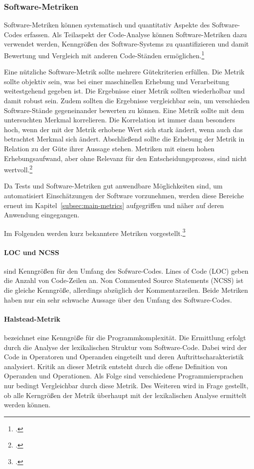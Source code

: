 \subsubsection{Software-Metriken}
\label{subsubsec:base-metrics}
Software-Metriken können systematisch und quantitativ Aspekte des Software-Codes erfassen. Als Teilaspekt der Code-Analyse können Software-Metriken dazu verwendet werden, Kenngrößen des Software-Systems zu quantifizieren und damit Bewertung und Vergleich mit anderen Code-Ständen ermöglichen.\footcite[S.247][]{software-quality2008}

Eine nützliche Software-Metrik sollte mehrere Gütekriterien erfüllen. Die Metrik sollte objektiv sein, was bei einer maschinellen Erhebung und Verarbeitung weitestgehend gegeben ist. Die Ergebnisse einer Metrik sollten wiederholbar und damit robust sein. Zudem sollten die Ergebnisse vergleichbar sein, um verschieden Software-Stände gegeneinander bewerten zu können. Eine Metrik sollte mit dem untersuchten Merkmal korrelieren. Die Korrelation ist immer dann besonders hoch, wenn der mit der Metrik erhobene Wert sich stark ändert, wenn auch das betrachtet Merkmal sich ändert. Abschließend sollte die Erhebung der Metrik in Relation zu der Güte ihrer Aussage stehen. Metriken mit einem hohen Erhebungsaufwand, aber ohne Relevanz für den Entscheidungsprozess, sind nicht wertvoll.\footcite[S.248 ff][]{software-quality2008}

Da Tests und Software-Metriken gut anwendbare Möglichkeiten sind, um automatisiert Einschätzungen der Software vorzunehmen, werden diese Bereiche erneut im Kapitel~\ref{subsec:main-metrics} aufgegriffen und näher auf deren Anwendung eingegangen.

Im Folgenden werden kurz bekanntere Metriken vorgestellt.\footcite[S.249 ff][]{software-quality2008}

\paragraph{LOC und NCSS} sind Kenngrößen für den Umfang des Sofware-Codes. \glqq Lines of Code\grqq{} (LOC) geben die Anzahl von Code-Zeilen an. \glqq Non Commented Source Statements\grqq{} (NCSS) ist die gleiche Kenngröße, allerdings abzüglich der Kommentarzeilen. Beide Metriken haben nur ein sehr schwache Aussage über den Umfang des Software-Codes.

\paragraph{Halstead-Metrik} bezeichnet eine Kenngröße für die Programmkomplexität. Die Ermittlung erfolgt durch die Analyse der lexikalischen Struktur vom Software-Code. Dabei wird der Code in Operatoren und Operanden eingeteilt und deren Auftrittscharakteristik analysiert. Kritik an dieser Metrik entsteht durch die offene Definition von Operanden und Operationen. Als Folge sind verschiedene Programmiersprachen nur bedingt Vergleichbar durch diese Metrik. Des Weiteren wird in Frage gestellt, ob alle Kerngrößen der Metrik überhaupt mit der lexikalischen Analyse ermittelt werden können.

